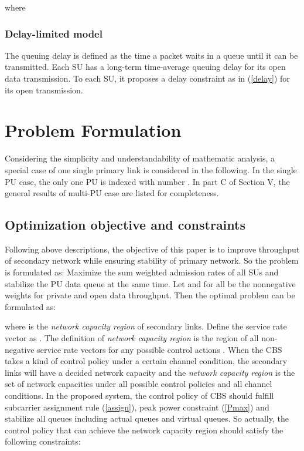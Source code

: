\documentclass[journal]{IEEEtran}
\begin{document}
where 







\subsubsection{Delay-limited model}
The queuing delay is defined as the time a packet waits in a queue until it can be transmitted. Each SU has a
 long-term time-average queuing delay  for its open data transmission. To each SU, it proposes a delay constraint 
as in (\ref{delay}) for its open transmission.




\section{Problem Formulation}
{ Considering the simplicity and understandability of mathematic analysis, a special case of one single primary link is considered in the following. In the single PU case, the only one PU is indexed with number . In part C of Section V, the general results of multi-PU case are listed for completeness.}
\subsection{Optimization objective and constraints}
 { Following  above descriptions, the objective of this paper is to improve throughput of secondary network while ensuring stability of primary network. So the problem  is formulated as: Maximize the sum weighted admission rates of all SUs and
 stabilize the PU data queue  at the same time. Let  and  for all  be the
 nonnegative weights for private and open data throughput.}  Then the optimal problem can be formulated as:

where  is the \emph{network capacity region} of secondary links. { Define the service rate vector as .  The definition of \emph{network capacity region}  is the region of all non-negative service rate vectors  for any possible control actions \cite{neely2010stochastic}.} When the CBS takes a kind of control policy under a certain channel condition, the secondary links will have a decided network capacity and the \emph{network capacity region}
is the set of network capacities under all possible control policies and all channel conditions. In the proposed system,
the control policy of CBS should fulfill subcarrier assignment rule (\ref{assign}), peak power constraint (\ref{Pmax}) and
stabilize all queues including actual queues and virtual queues. { So actually, the control policy that can achieve the network capacity region should satisfy  the following constraints:
}
\end{document}
